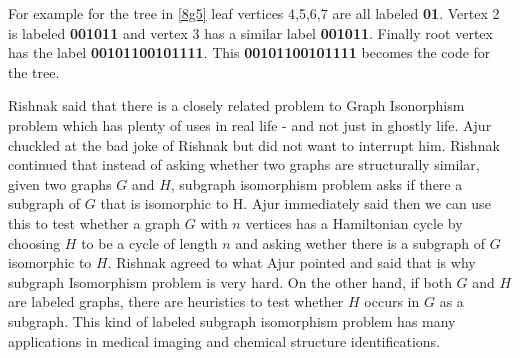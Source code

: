 For example for the tree in \ref{8g5} leaf vertices 4,5,6,7 are all labeled \textbf{01}. Vertex 2 is labeled \textbf{001011} and vertex 3 has a similar label \textbf{001011}. Finally root vertex has the label \textbf{00101100101111}. This \textbf{00101100101111} becomes the code for the tree.

Rishnak said that there is a closely related problem to Graph Isonorphism problem which has plenty of uses in real life - and not just in ghostly life. Ajur chuckled at the bad joke of Rishnak but did not want to interrupt him. Rishnak continued that instead of asking whether two graphs are structurally similar, given two graphs $G$ and $H$, subgraph isomorphism problem asks if there a subgraph of $G$ that is isomorphic to H. Ajur immediately said then we can use this to test whether a graph $G$ with $n$ vertices has a Hamiltonian cycle by choosing $H$ to be a cycle of length $n$ and asking wether there is a subgraph of $G$ isomorphic to $H$. Rishnak agreed to what Ajur pointed and said that is why subgraph Isomorphism problem is very hard. On the other hand, if both $G$ and $H$ are labeled graphs, there are heuristics to test whether $H$ occurs in $G$ as a subgraph. This kind of labeled subgraph isomorphism problem has many applications in medical imaging and chemical structure identifications.


